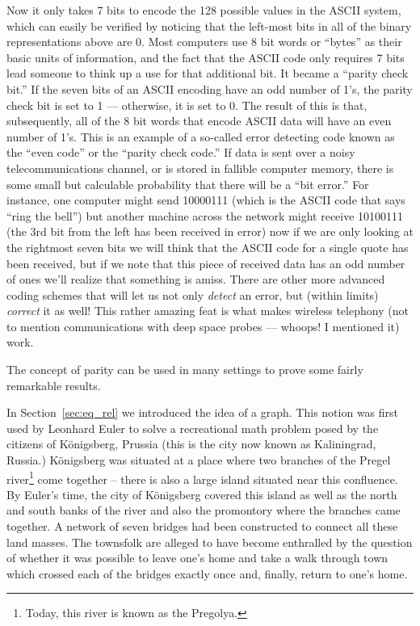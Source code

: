 Now it only takes 7 bits to encode the 128 possible values in the
ASCII system, which can easily be verified by noticing that the left-most
bits in all of the binary representations above are 0.   Most computers 
use 8 bit words or ``bytes'' as their basic units of information, and the
fact that the ASCII code only requires 7 bits lead someone to think up 
a use for that additional bit.  It became a ``parity check bit.''  If the
seven bits of an ASCII encoding have an odd number of 1's, the parity
check bit is set to 1 --- otherwise, it is set to 0.  The result of this
is that, subsequently, all of the 8 bit words that encode ASCII data will have
an even number of 1's.  This is an example of a so-called  error detecting
code known as the ``even code'' or the ``parity check code.''  If 
data is sent over a noisy telecommunications channel, or is stored in
fallible computer memory, there is some small but calculable probability
that there will be a ``bit error.''   For instance, one computer might
send 10000111 (which is the ASCII code that says ``ring the bell'') but
another machine across the network might receive 10100111 (the 3rd bit from 
the left has been received in error) now if we are only looking at the 
rightmost seven bits we will think that the ASCII code for a single quote
has been received, but if we note that this piece of received data has an
odd number of ones we'll realize that something is amiss.  There are other
more advanced coding schemes that will let us not only \emph{detect} an
error, but (within limits) \emph{correct} it as well!  This rather amazing
feat is what makes wireless telephony (not to mention communications
with deep space probes --- whoops! I mentioned it) work.  

The concept of parity can be used in many settings to prove some
fairly remarkable results.  

In Section~\ref{sec:eq_rel} we introduced the idea of a graph.  This
notion was first used by  Leonhard Euler to solve
a recreational math problem posed by the citizens of 
K\"{o}nigsberg, Prussia (this is the city now known
as  Kaliningrad, Russia.)  K\"{o}nigsberg was situated 
at a place where two branches of the  Pregel river\footnote{Today, this river is known as the Pregolya.} come together -- there is also
a large island situated near this confluence.  By Euler's time, the city of
 K\"{o}nigsberg covered this island as well as the north and south banks of the
river and also the promontory where the branches came together.  A network of
seven bridges had been constructed to connect all these land masses.  The
townsfolk are alleged to have become enthralled by the question of whether it
was possible to leave one's home and take a walk through town
which crossed each of the bridges exactly once and, finally, return to one's
home.  

